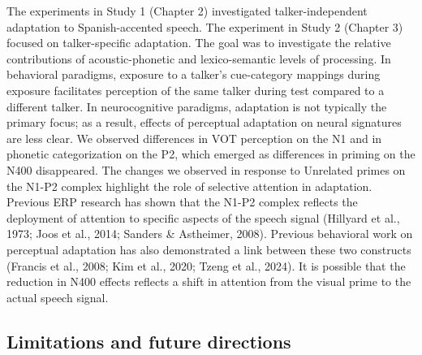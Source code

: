 \documentclass[
  12pt,
  twoside]{article}
\begin{document}
The experiments in Study 1 (Chapter 2) investigated talker-independent adaptation to Spanish-accented speech.
The experiment in Study 2 (Chapter 3) focused on talker-specific adaptation.
The goal was to investigate the relative contributions of acoustic-phonetic and lexico-semantic levels of processing.
In behavioral paradigms, exposure to a talker's cue-category mappings during exposure facilitates perception of the same talker during test compared to a different talker.
In neurocognitive paradigms, adaptation is not typically the primary focus; as a result, effects of perceptual adaptation on neural signatures are less clear.
We observed differences in VOT perception on the N1 and in phonetic categorization on the P2, which emerged as differences in priming on the N400 disappeared.
The changes we observed in response to Unrelated primes on the N1-P2 complex highlight the role of selective attention in adaptation.
Previous ERP research has shown that the N1-P2 complex reflects the deployment of attention to specific aspects of the speech signal (Hillyard et al., 1973; Joos et al., 2014; Sanders \& Astheimer, 2008).
Previous behavioral work on perceptual adaptation has also demonstrated a link between these two constructs (Francis et al., 2008; Kim et al., 2020; Tzeng et al., 2024).
It is possible that the reduction in N400 effects reflects a shift in attention from the visual prime to the actual speech signal.

\hypertarget{limitations-and-future-directions}{%
\subsection{Limitations and future directions}\label{limitations-and-future-directions}}
\end{document}
